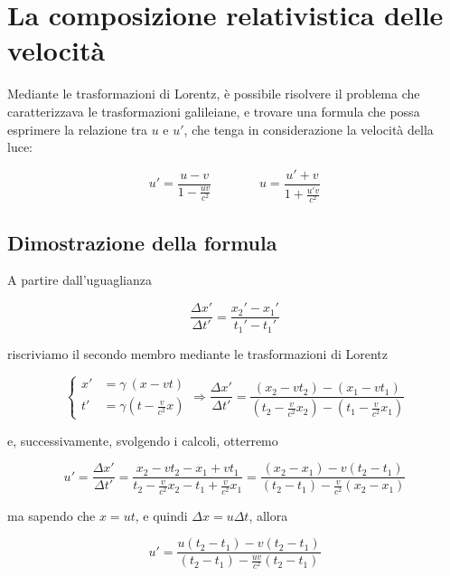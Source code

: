 \documentclass{article}
\begin{document}
\section{La composizione relativistica delle velocità}
Mediante le trasformazioni di Lorentz, è possibile risolvere il
problema che caratterizzava le trasformazioni galileiane, e trovare
una formula che possa esprimere la relazione tra \(u\) e \(u'\),
che tenga in considerazione la velocità della luce:

\begin{equation}
    u' = \frac{u - v}{1 - \frac{uv}{c^2}}\ \ \ \ \ \ \ \ \ \ \ \ \ \ \ \ \ u = \frac{u' + v}{1 + \frac{u'v}{c^2}} %
\end{equation}

\subsection{Dimostrazione della formula}
A partire dall'uguaglianza

\begin{equation}
    \frac{\Delta x'}{\Delta t'} = \frac{x_2' - x_1'}{t_1' - t_1'}
\end{equation}

riscriviamo il secondo membro mediante le trasformazioni di Lorentz

\begin{equation}
    \left\{
        \begin{aligned}
        x' &= \gamma\ (x - vt) \\
        t' &= \gamma \left(t - \frac{v}{c^2} x\right)
        \end{aligned}
    \right.
    \Rightarrow
    \frac{\Delta x'}{\Delta t'} = \frac{(x_2 - vt_2) - (x_1 - vt_1)}{(t_2 - \frac{v}{c^2} x_2) - (t_1 - \frac{v}{c^2} x_1)}
\end{equation}

e, successivamente, svolgendo i calcoli, otterremo

\begin{equation}
    u' = \frac{\Delta x'}{\Delta t'} = \frac{x_2 - vt_2 - x_1 + vt_1}{t_2 - \frac{v}{c^2} x_2 - t_1 + \frac{v}{c^2} x_1} = \frac{(x_2 - x_1) - v(t_2 - t_1)}{(t_2 - t_1) - \frac{v}{c^2}(x_2 - x_1)}
\end{equation}

ma sapendo che \(x = ut\), e quindi \(\Delta x = u \Delta t\), allora

\begin{equation}
    u' = \frac{u(t_2 - t_1) - v(t_2 - t_1)}{(t_2 - t_1)-\frac{uv}{c^2}(t_2 - t_1)}
\end{equation}
\end{document}
